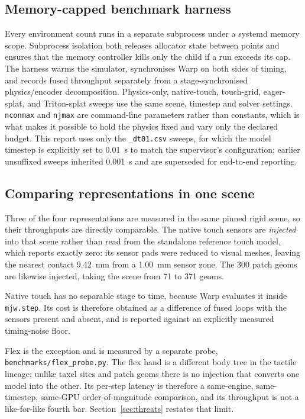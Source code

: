 \documentclass[journal]{IEEEtran}
\begin{document}
\subsection{Memory-capped benchmark harness}

Every environment count runs in a separate subprocess under a systemd memory scope. Subprocess isolation both releases allocator state between points and ensures that the memory controller kills only the child if a run exceeds its cap. The harness warms the simulator, synchronises Warp on both sides of timing, and records fused throughput separately from a stage-synchronised physics/encoder decomposition. Physics-only, native-touch, touch-grid, eager-splat, and Triton-splat sweeps use the same scene, timestep and solver settings. \texttt{nconmax} and \texttt{njmax} are command-line parameters rather than constants, which is what makes it possible to hold the physics fixed and vary only the declared budget. This report uses only the \texttt{\_dt01.csv} sweeps, for which the model timestep is explicitly set to 0.01~s to match the supervisor's configuration; earlier unsuffixed sweeps inherited 0.001~s and are superseded for end-to-end reporting.

\subsection{Comparing representations in one scene}

Three of the four representations are measured in the same pinned rigid scene, so their throughputs are directly comparable. The native touch sensors are \emph{injected} into that scene rather than read from the standalone reference touch model, which reports exactly zero: its sensor pads were reduced to visual meshes, leaving the nearest contact 9.42~mm from a 1.00~mm sensor zone. The 300 patch geoms are likewise injected, taking the scene from 71 to 371 geoms.

Native touch has no separable stage to time, because Warp evaluates it inside \texttt{mjw.step}. Its cost is therefore obtained as a difference of fused loops with the sensors present and absent, and is reported against an explicitly measured timing-noise floor.

Flex is the exception and is measured by a separate probe, \texttt{benchmarks/flex\_probe.py}. The flex hand is a different body tree in the tactile lineage; unlike taxel sites and patch geoms there is no injection that converts one model into the other. Its per-step latency is therefore a same-engine, same-timestep, same-GPU order-of-magnitude comparison, and its throughput is not a like-for-like fourth bar. Section~\ref{sec:threats} restates that limit.
\end{document}
